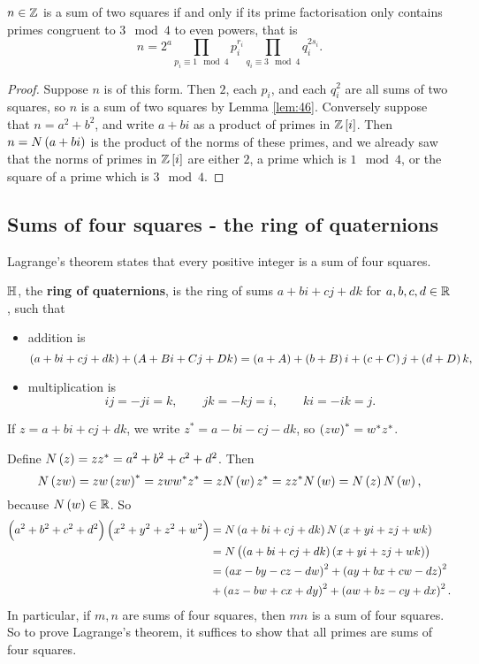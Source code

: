 \begin{theorem}
$ n \in \mathbb{Z} $ is a sum of two squares if and only if its prime factorisation only contains primes congruent to $ 3 \mod 4 $ to even powers, that is
$$ n = 2^a\prod_{p_i \equiv 1 \mod 4} p_i^{r_i}\prod_{q_i \equiv 3 \mod 4} q_i^{2s_i}. $$
\end{theorem}

\begin{proof}
Suppose $ n $ is of this form. Then $ 2 $, each $ p_i $, and each $ q_i^2 $ are all sums of two squares, so $ n $ is a sum of two squares by Lemma \ref{lem:46}. Conversely suppose that $ n = a^2 + b^2 $, and write $ a + bi $ as a product of primes in $ \Z\sbr{i} $. Then $ n = N\br{a + bi} $ is the product of the norms of these primes, and we already saw that the norms of primes in $ \Z\sbr{i} $ are either $ 2 $, a prime which is $ 1 \mod 4 $, or the square of a prime which is $ 3 \mod 4 $.
\end{proof}

\subsection{Sums of four squares - the ring of quaternions}

Lagrange's theorem states that every positive integer is a sum of four squares.

\begin{definition}
$ \mathbb{H} $, the \textbf{ring of quaternions}, is the ring of sums $ a + bi + cj + dk $ for $ a, b, c, d \in \mathbb{R} $, such that
\begin{itemize}
\item addition is
$$ \br{a + bi + cj + dk} + \br{A + Bi + Cj + Dk} = \br{a + A} + \br{b + B}i + \br{c + C}j + \br{d + D}k, $$
\item multiplication is
$$ ij = -ji = k, \qquad jk = -kj = i, \qquad ki = -ik = j. $$
\end{itemize}
If $ z = a + bi + cj + dk $, we write $ z^* = a - bi - cj - dk $, so $ \br{zw}^* = w^*z^* $.
\end{definition}

Define $ N\br{z} = zz^* = a^2 + b^2 + c^2 + d^2 $. Then
$$ N\br{zw} = zw\br{zw}^* = zww^*z^* = zN\br{w}z^* = zz^*N\br{w} = N\br{z}N\br{w}, $$
because $ N\br{w} \in \R $. So
\begin{align*}
\br{a^2 + b^2 + c^2 + d^2}\br{x^2 + y^2 + z^2 + w^2}
& = N\br{a + bi + cj + dk}N\br{x + yi + zj + wk} \\
& = N\br{\br{a + bi + cj + dk}\br{x + yi + zj + wk}} \\
& = \br{ax - by - cz - dw}^2 + \br{ay + bx + cw - dz}^2 \\
& + \br{az - bw + cx + dy}^2 + \br{aw + bz - cy + dx}^2.
\end{align*}
In particular, if $ m, n $ are sums of four squares, then $ mn $ is a sum of four squares. So to prove Lagrange's theorem, it suffices to show that all primes are sums of four squares.

